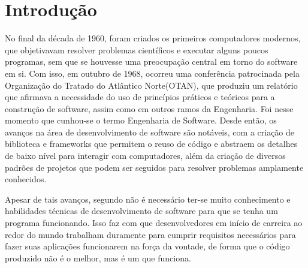 \documentclass[12pt, %
openright, 
oneside, %
a4paper,    %
brazil]{facom-ufu-abntex2}
\begin{document}

\tableofcontents*
\cleardoublepage





\textual



\chapter[Introdução]{Introdução}

No final da década de 1960, foram criados os primeiros computadores modernos, que objetivavam resolver problemas científicos e executar alguns poucos programas, sem que se houvesse uma preocupação central em torno do software em si. Com isso, em outubro de 1968, ocorreu uma conferência patrocinada pela Organização do Tratado do Atlântico Norte(OTAN), que produziu um relatório que afirmava a necessidade do uso de princípios práticos e teóricos para a construção de software, assim como em outros ramos da Engenharia. Foi nesse momento que cunhou-se o termo Engenharia de Software. Desde então, os avanços na área de desenvolvimento de software são notáveis, com a criação de biblioteca e frameworks que permitem o reuso de código e abstraem os detalhes de baixo nível para interagir com computadores, além da criação de diversos padrões de projetos que podem ser seguidos para resolver problemas amplamente conhecidos\cite{engsoftmoderna}.

Apesar de tais avanços, segundo  não é necessário ter-se muito conhecimento e habilidades técnicas de desenvolvimento de software para que se tenha um programa funcionando. Isso faz com que desenvolvedores em início de carreira ao redor do mundo trabalham duramente para cumprir requisitos necessários para fazer suas aplicações funcionarem na força da vontade, de forma que o código produzido não é o melhor, mas é um que funciona.
\end{document}
